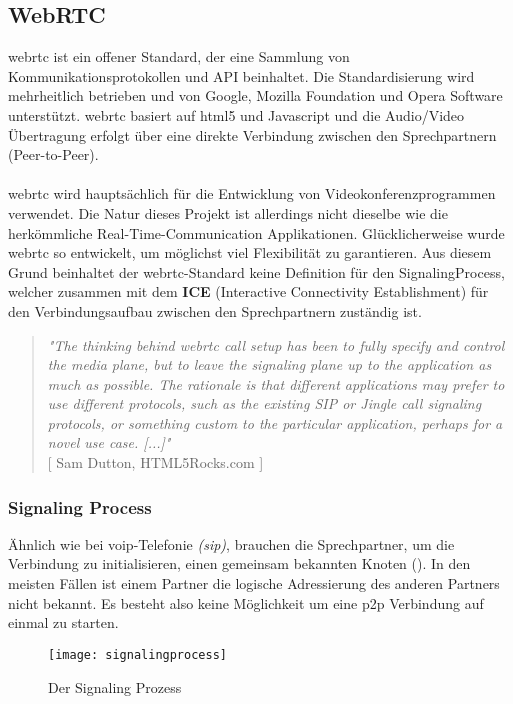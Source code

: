 \subsection{WebRTC}
\label{kap:webrtc}
\gls{webrtc} ist ein offener Standard, der eine Sammlung von Kommunikationsprotokollen und API beinhaltet. Die Standardisierung wird mehrheitlich betrieben und von Google, Mozilla Foundation und Opera Software unterstützt. \gls{webrtc} basiert auf \gls{html}5 und Javascript und die Audio/Video Übertragung erfolgt über eine direkte Verbindung zwischen den Sprechpartnern (Peer-to-Peer).
\\
\\
\gls{webrtc} wird hauptsächlich für die Entwicklung von Videokonferenzprogrammen verwendet. Die Natur dieses Projekt ist allerdings nicht dieselbe wie die herkömmliche Real-Time-Communication Applikationen. Glücklicherweise wurde \gls{webrtc} so entwickelt, um möglichst viel Flexibilität zu garantieren. Aus diesem Grund beinhaltet der \gls{webrtc}-Standard keine Definition für den SignalingProcess, welcher zusammen mit dem \textbf{ICE} (Interactive Connectivity Establishment) für den Verbindungsaufbau zwischen den Sprechpartnern zuständig ist.

\begin{quote}
	\textit{
		"The thinking behind \gls{webrtc} call setup has been to fully specify and control the media plane, but to leave the signaling plane up to the application as much as possible. The rationale is that different applications may prefer to use different protocols, such as the existing SIP or Jingle call signaling protocols, or something custom to the particular application, perhaps for a novel use case. [...]"
	} 
	\\
	\nocite{} [ Sam Dutton, HTML5Rocks.com ]
\end{quote}

\subsubsection{Signaling Process}
\label{kap:signaling}
Ähnlich wie bei \gls{voip}-Telefonie \textit{(\gls{sip})}, brauchen die Sprechpartner, um die Verbindung zu initialisieren, einen gemeinsam bekannten Knoten (). In den meisten Fällen ist einem Partner die logische Adressierung des anderen Partners nicht bekannt. Es besteht also keine Möglichkeit um eine \gls{p2p} Verbindung auf einmal zu starten.

\begin{figure}[htb!]
	\begin{center}
		\texttt{[image: signalingprocess]}
		\caption[Der Signaling Prozess]{Der Signaling Prozess}
		\label{fig:signaling}
	\end{center}
\end{figure}

